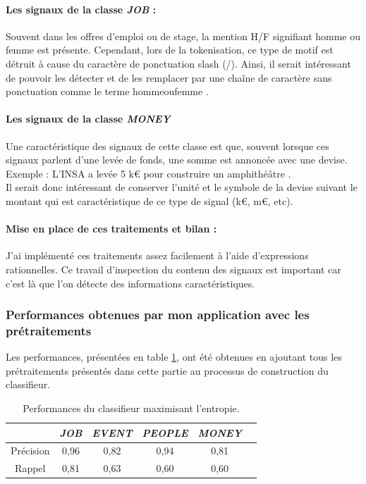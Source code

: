                 \paragraph{Les signaux de la classe \textit {JOB} :}
                    Souvent dans les offres d'emploi ou de stage, la mention \og H/F \fg signifiant \og homme ou femme \fg est présente. Cependant, lors de la tokenisation, ce type de motif est détruit à cause du caractère de ponctuation slash (/). Ainsi, il serait intéressant de pouvoir les détecter et de les remplacer par une chaîne de caractère sans ponctuation comme le terme \og hommeoufemme \fg.

                \paragraph{Les signaux de la classe \textit{MONEY}}
                    Une caractéristique des signaux de cette classe est que, souvent lorsque ces signaux parlent d'une levée de fonds, une somme est annoncée avec une devise. Exemple : \og L'INSA a levée 5 k€ pour construire un amphithéâtre \fg.\\
                    Il serait donc intéressant de conserver l'unité et le symbole de la devise suivant le montant qui est caractéristique de ce type de signal (k€, m€, etc).

                \paragraph{Mise en place de ces traitements et bilan :}
                    J'ai implémenté ces traitements assez facilement à l'aide d'expressions rationnelles. Ce travail d'inspection du contenu des signaux est important car c'est là que l'on détecte des informations caractéristiques.

            \subsubsection{Performances obtenues par mon application avec les prétraitements}
                Les performances, présentées en table \ref{tab:classif_perf4}, ont été obtenues en ajoutant tous les prétraitements présentés dans cette partie au processus de construction du classifieur.
                \begin{table}[t]
                    \centering
                    \begin{tabular}{| c | c | c | c | c | c |}
                        \hline
                         & \textit{JOB} & \textit{EVENT} & \textit{PEOPLE} & \textit{MONEY} \\
                        \hline
                        Précision & 0,96 & 0,82 & 0,94 & 0,81 \\
                        Rappel & 0,81 & 0,63 & 0,60 & 0,60 \\
                        \hline
                    \end{tabular}
                    \caption{Performances du classifieur maximisant l'entropie.}
                    \label{tab:classif_perf4}
                \end{table}


